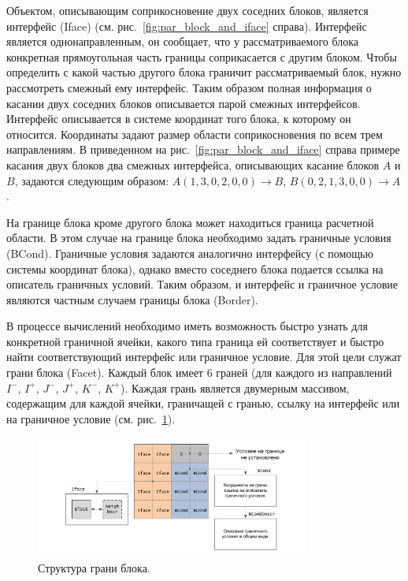 Объектом, описывающим соприкосновение двух соседних блоков, является интерфейс (Iface) (см. рис.~\ref{fig:par_block_and_iface} справа).
Интерфейс является однонаправленным, он сообщает, что у рассматриваемого блока конкретная прямоугольная часть границы соприкасается с другим блоком.
Чтобы определить с какой частью другого блока граничит рассматриваемый блок, нужно рассмотреть смежный ему интерфейс.
Таким образом полная информация о касании двух соседних блоков описывается парой смежных интерфейсов.
Интерфейс описывается в системе координат того блока, к которому он относится.
Координаты задают размер области соприкосновения по всем трем направлениям.
В приведенном на рис.~\ref{fig:par_block_and_iface} справа примере касания двух блоков два смежных интерфейса, описывающих касание блоков $A$ и $B$, задаются следующим образом: $A(1, 3, 0, 2, 0, 0) \rightarrow B$, $B(0, 2, 1, 3, 0, 0) \rightarrow A$.

На границе блока кроме другого блока может находиться граница расчетной области.
В этом случае на границе блока необходимо задать граничные условия (BCond).
Граничные условия задаются аналогично интерфейсу (с помощью системы координат блока), однако вместо соседнего блока подается ссылка на описатель граничных условий.
Таким образом, и интерфейс и граничное условие являются частным случаем границы блока (Border).

В процессе вычислений необходимо иметь возможность быстро узнать для конкретной граничной ячейки, какого типа граница ей соответствует и быстро найти соответствующий интерфейс или граничное условие.
Для этой цели служат грани блока (Facet).
Каждый блок имеет 6 граней (для каждого из направлений $I^{-}$, $I^{+}$, $J^{-}$, $J^{+}$, $K^{-}$, $K^{+}$).
Каждая грань является двумерным массивом, содержащим для каждой ячейки, граничащей с гранью, ссылку на интерфейс или на граничное условие (см. рис.~\ref{fig:text_2_block_facet}).

\begin{figure}[ht]
\centering
\includegraphics[width=0.8\textwidth]{fig/par_8-facet.pdf}
\singlespacing
{}\caption{Структура грани блока.}
\label{fig:text_2_block_facet}
\end{figure}

